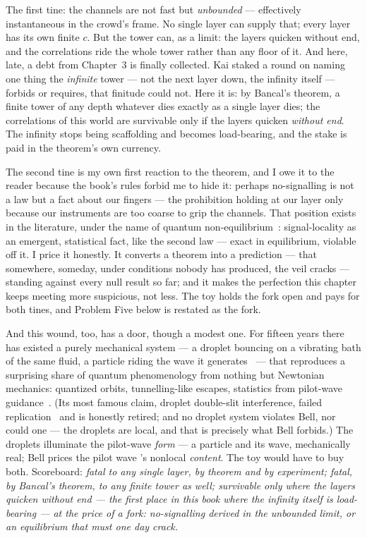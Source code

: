 \documentclass[fontsize=11pt,paper=a4,pagesize=auto,parskip=half-]{scrbook}
\newcommand{\Ixtmp}{}
\DeclareRobustCommand{\Ix}[1]{%
  #1%
  \begingroup
    \lowercase{\gdef\Ixtmp{#1}}%
    \expandafter\index\expandafter{\Ixtmp}%
  \endgroup}
\begin{document}
The first tine: the channels are not fast but \emph{unbounded} --- effectively instantaneous in the crowd's frame. No single layer can supply that; every layer has its own finite $c$. But the tower can, as a limit: the layers quicken without end, and the correlations ride the whole tower rather than any floor of it. And here, late, a debt from Chapter~3 is finally collected. Kai staked a round on naming one thing the \emph{infinite} tower --- not the next layer down, the infinity itself --- forbids or requires, that finitude could not. Here it is: by Bancal's theorem, a finite tower of any depth whatever dies exactly as a single layer dies; the correlations of this world are survivable only if the layers quicken \emph{without end}. The infinity stops being scaffolding and becomes load-bearing, and the stake is paid in the theorem's own currency.

The second tine is my own first reaction to the theorem, and I owe it to the reader because the book's rules forbid me to hide it: perhaps no-signalling is not a law but a fact about our fingers --- the prohibition holding at our layer only because our instruments are too coarse to grip the channels. That position exists in the literature, under the name of quantum non-equilibrium~\cite{valentini2002}: signal-locality as an emergent, statistical fact, like the second law --- exact in equilibrium, violable off it. I price it honestly. It converts a theorem into a prediction --- that somewhere, someday, under conditions nobody has produced, the veil cracks --- standing against every null result so far; and it makes the perfection this chapter keeps meeting more suspicious, not less. The toy holds the fork open and pays for both tines, and Problem Five below is restated as the fork.

And this wound, too, has a door, though a modest one. For fifteen years there has existed a purely mechanical system --- a droplet bouncing on a vibrating bath of the same fluid, a particle riding the wave it generates~\cite{couder2006} --- that reproduces a surprising share of quantum phenomenology from nothing but Newtonian mechanics: quantized orbits, tunnelling-like escapes, statistics from pilot-wave guidance~\cite{bush2015}. (Its most famous claim, droplet double-slit interference, failed replication~\cite{andersen2015} and is honestly retired; and no droplet system violates Bell, nor could one --- the droplets are local, and that is precisely what Bell forbids.) The droplets illuminate the pilot-wave \emph{form} --- a particle and its wave, mechanically real; Bell prices the \Ix{pilot wave}'s nonlocal \emph{content}. The toy would have to buy both. Scoreboard: \emph{fatal to any single layer, by theorem and by experiment; fatal, by Bancal's theorem, to any finite tower as well; survivable only where the layers quicken without end --- the first place in this book where the infinity itself is load-bearing --- at the price of a fork: no-signalling derived in the unbounded limit, or an equilibrium that must one day crack.}
\end{document}
